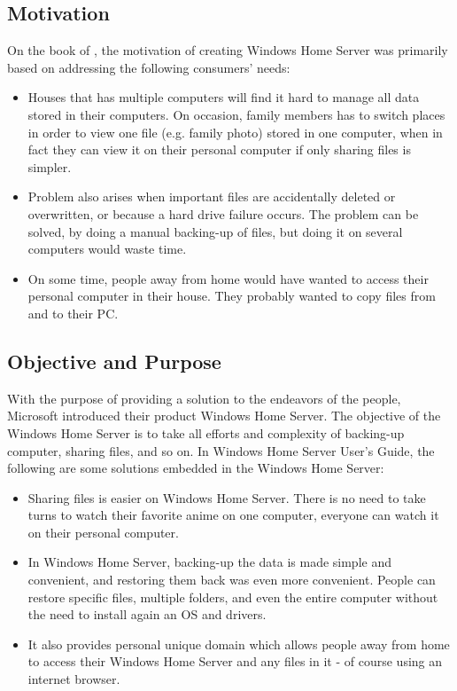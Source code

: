 \documentclass[a4paper, 12pt]{article}
\begin{document}
\subsection{Motivation}
On the book of \cite{Edney2007guide}, the motivation of creating Windows Home Server was primarily based on addressing the following consumers' needs: 
\begin{itemize}
    \item Houses that has multiple computers will find it hard to manage all data stored in their computers. On occasion, family members has to switch places in order to view one file (e.g. family photo) stored in one computer, when in fact they can view it on their personal computer if only sharing files is simpler.
    \item Problem also arises when important files are accidentally deleted or overwritten, or because a  hard drive failure occurs. The problem can be solved, by doing a manual backing-up of files, but doing it on several computers would waste time. 
    \item On some time, people away from home would have wanted to access their personal computer in their house. They probably wanted to copy files from and to their PC. 
\end{itemize}



\subsection{Objective and Purpose}
With the purpose of providing a solution to the endeavors of the people, Microsoft introduced their product Windows Home Server. The objective of the Windows Home Server is to take all efforts and complexity of backing-up computer, sharing  files, and so on. In Windows Home Server User's Guide\parencite{Edney2007guide}, the following are some solutions embedded in the Windows Home Server:
\begin{itemize}
    \item Sharing files is easier on Windows Home Server. There is no need to take turns to watch their favorite anime on one computer, everyone can watch it on their personal computer. 
    \item In Windows Home Server, backing-up the data is made simple and convenient, and restoring them back was even more convenient. People can restore specific files, multiple folders, and even the entire computer without the need to install again an OS and drivers. 
    \item It also provides personal unique domain which allows people away from home to access their Windows Home Server and any files in it - of course using an internet browser.
\end{itemize}
\end{document}
